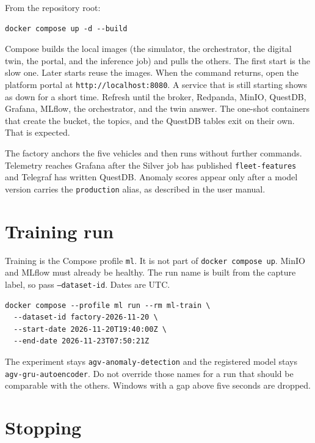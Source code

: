 From the repository root:

\begin{lstlisting}[basicstyle=\ttfamily\small,breaklines=true]
docker compose up -d --build
\end{lstlisting}

Compose builds the local images (the simulator, the orchestrator, the digital twin, the portal, and the inference job) and pulls the others. The first start is the slow one. Later starts reuse the images. When the command returns, open the platform portal at \texttt{http://localhost:8080}. A service that is still starting shows as down for a short time. Refresh until the broker, Redpanda, MinIO, QuestDB, Grafana, MLflow, the orchestrator, and the twin answer. The one-shot containers that create the bucket, the topics, and the QuestDB tables exit on their own. That is expected.

The factory anchors the five vehicles and then runs without further commands. Telemetry reaches Grafana after the Silver job has published \texttt{fleet-features} and Telegraf has written QuestDB. Anomaly scores appear only after a model version carries the \texttt{production} alias, as described in the user manual.

\section{Training run}

Training is the Compose profile \texttt{ml}. It is not part of \texttt{docker compose up}. MinIO and MLflow must already be healthy. The run name is built from the capture label, so pass \texttt{--dataset-id}. Dates are UTC.

\begin{lstlisting}[basicstyle=\ttfamily\small,breaklines=true]
docker compose --profile ml run --rm ml-train \
  --dataset-id factory-2026-11-20 \
  --start-date 2026-11-20T19:40:00Z \
  --end-date 2026-11-23T07:50:21Z
\end{lstlisting}

The experiment stays \texttt{agv-anomaly-detection} and the registered model stays \texttt{agv-gru-autoencoder}. Do not override those names for a run that should be comparable with the others. Windows with a gap above five seconds are dropped.

\section{Stopping}

